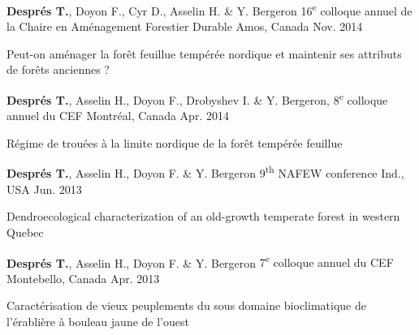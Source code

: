 \begin{cventries}
  \cventry
  {\textbf{Després T.}, Doyon F., Cyr D., Asselin H. \& Y. Bergeron}
  {16\textsuperscript{e} colloque annuel de la Chaire en Aménagement Forestier Durable}
  {Amos, Canada}
  {Nov. 2014}
  {
      \begin{cvitems}
        \item []{Peut-on aménager la forêt feuillue tempérée nordique et maintenir ses attributs de forêts anciennes ?}
      \end{cvitems}
    }
    \cventry
    {\textbf{Després T.}, Asselin H., Doyon F., Drobyshev I. \& Y. Bergeron,}
    {8\textsuperscript{e} colloque annuel du CEF}
    {Montréal, Canada}
    {Apr. 2014}
    {
      \begin{cvitems}
        \item []{Régime de trouées à la limite nordique de la forêt tempérée feuillue}
      \end{cvitems}
    }
    \cventry
    {\textbf{Després T.}, Asselin H., Doyon F. \& Y. Bergeron}
    {9\textsuperscript{th} NAFEW conference}
    {Ind., USA}
    {Jun. 2013}
    {
      \begin{cvitems}
        \item []{Dendroecological characterization of an old-growth temperate forest in western Quebec}
      \end{cvitems}
    }
    \cventry
    {\textbf{Després T.}, Asselin H., Doyon F. \& Y. Bergeron}
    {7\textsuperscript{e} colloque annuel du CEF}
    {Montebello, Canada}
    {Apr. 2013}
    {
      \begin{cvitems}
        \item []{Caractérisation de vieux peuplements du sous domaine bioclimatique de l'érablière à bouleau jaune de l'ouest}
      \end{cvitems}
    }

 \end{cventries}

